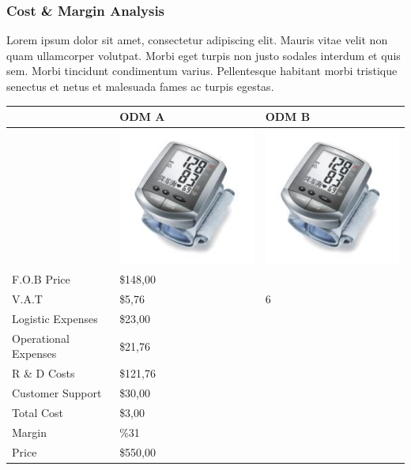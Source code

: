 \documentclass[11pt,a4paper,titlepage]{article}
\begin{document}
\subsubsection{Cost \& Margin Analysis}
Lorem ipsum dolor sit amet, consectetur adipiscing elit. Mauris vitae velit 
non quam ullamcorper volutpat. Morbi eget turpis non justo sodales interdum 
et quis sem. Morbi tincidunt condimentum varius. Pellentesque habitant morbi 
tristique senectus et netus et malesuada fames ac turpis egestas.\newline
\begin{tabular}{ | l | l | l | }\hline
  & ODM A & ODM B\\\hline
  & \includegraphics[scale=0.40,bb=0 0 150 150]{prod_bpm4.jpg} &
  \includegraphics[scale=0.40,bb=0 0 150 150]{prod_bpm4.jpg}\\\hline
  F.O.B Price & \$148,00 &\\\hline
  V.A.T & \$5,76 & 6\\\hline
  Logistic Expenses & \$23,00 &\\\hline
  Operational Expenses & \$21,76 &\\\hline
  R \& D Costs & \$121,76 &\\\hline
  Customer Support & \$30,00 &\\\hline
  Total Cost & \$3,00 &\\\hline
  Margin & \%31 &\\\hline
  Price & \$550,00 &\\\hline
\end{tabular}
\pagebreak
\end{document}

